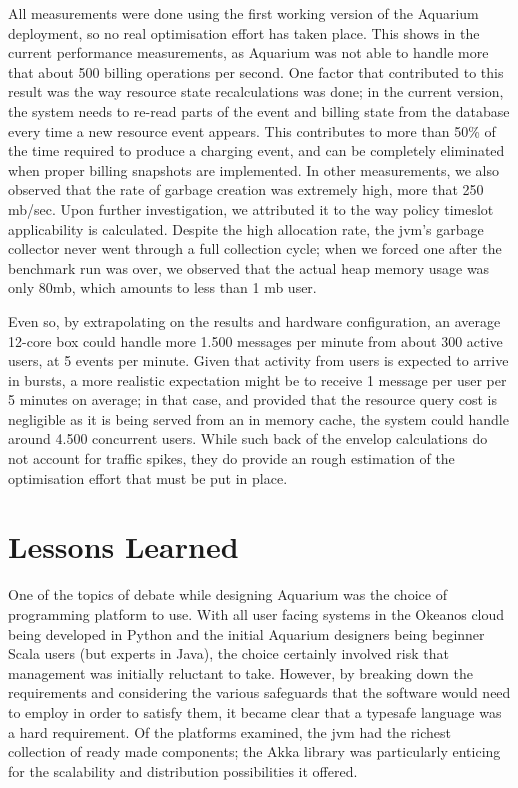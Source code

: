 \documentclass[preprint,10pt]{sigplanconf}
\begin{document}
All measurements were done using the first working version of the Aquarium
deployment, so no real optimisation effort has taken place. This shows in the
current performance measurements, as Aquarium was not able to handle more that
about 500 billing operations per second. One factor that contributed to this
result was the way resource state recalculations was done; in the current
version, the system needs to re-read parts of the event and billing state from
the database every time a new resource event appears. This contributes to more
than 50\% of the time required to produce a charging event, and can be
completely eliminated when proper billing snapshots are implemented. In other
measurements, we also observed that the rate of garbage creation was extremely
high, more that 250 {\sc mb/sec}. Upon further investigation, we attributed it
to the way policy timeslot applicability is calculated. Despite the high
allocation rate, the {\sc jvm}'s garbage collector never went through a
full collection cycle; when we forced one after the benchmark run was over, 
we observed that the actual heap memory usage was only 80{\sc mb}, which
amounts to less than 1 {\sc mb} user.

Even so, by extrapolating on the results and hardware configuration, an average
12-core box could handle more 1.500 messages per minute from about 300 active
users, at 5 events per minute. Given that activity from users is expected to
arrive in bursts, a more realistic expectation might be to receive 1 message
per user per 5 minutes on average; in that case, and provided that the resource
query cost is negligible as it is being served from an in memory cache, the
system could handle around 4.500 concurrent users. While such back of the
envelop calculations do not account for traffic spikes, they do provide an
rough estimation of the optimisation effort that must be put in place. 


\section{Lessons Learned}

One of the topics of debate while designing Aquarium was the choice of
programming platform to use. With all user facing systems in the Okeanos cloud
being developed in Python and the initial Aquarium designers being beginner
Scala users (but experts in Java), the choice certainly involved risk that
management was initially reluctant to take. However, by breaking down the
requirements and considering the various safeguards that the software would
need to employ in order to satisfy them, it became clear that a
typesafe language was a hard requirement. Of the platforms examined, the {\sc
jvm} had the richest collection of ready made components; the Akka library was
particularly enticing for the scalability and distribution possibilities it
offered.
\end{document}
